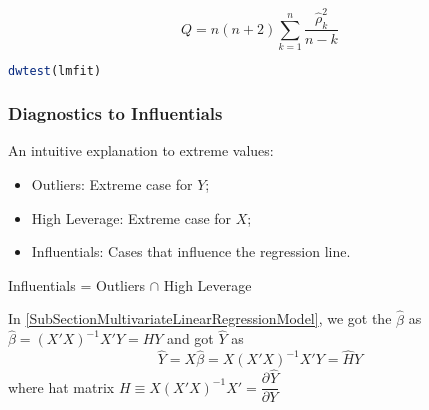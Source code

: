 \begin{itemize}[topsep=2pt,itemsep=2pt]
\begin{itemize}
        \begin{equation}
            Q=n(n+2)\sum_{k=1}^n\dfrac{\hat{\rho}_k^2}{n-k} 
        \end{equation}
        
        
    \end{itemize}

\begin{rcode}
\begin{lstlisting}[language=R]
dwtest(lmfit)
\end{lstlisting}

\end{rcode}   
        
\end{itemize}














    
        
        


\subsubsection{Diagnostics to Influentials}\label{SubSubSectionDiagnosticsToInfluentials}
    An intuitive explanation to extreme values:
    \begin{itemize}[topsep=2pt,itemsep=2pt]
        \item Outliers: Extreme case for $ Y $;
        \item High Leverage: Extreme case for $ X $;
        \item Influentials: Cases that influence the regression line.
    \end{itemize}

    \begin{point}
        Influentials = Outliers $ \cap $ High Leverage
    \end{point}
    

    In \autoref{SubSectionMultivariateLinearRegressionModel}, we got the $ \hat{\beta}  $ as $\hat{ \beta} = (X'X)^{-1}X'Y=HY $ and got $ \hat{Y} $ as 
    \begin{equation}
        \hat{Y}= X\hat{\beta }=X(X'X)^{-1}X'Y=\hat{H}Y
    \end{equation}
    where hat matrix $ H\equiv  X(X'X)^{-1}X'=\dfrac{\partial^{} \hat{Y}}{\partial Y^{}}$

